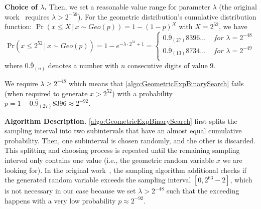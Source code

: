 \textbf{Choice of $\lambda$.}
Then, we set a reasonable value range for parameter $\lambda$ (the original work~\cite{googleDP2019} requires $\lambda > 2^{-59}$).
For the geometric distribution's cumulative distribution function: $\Pr\left(x\leq X \,|\,x \sim Geo\left(p\right) \right) =1-\left(1-p\right)^X $ with $X=2^{52}$, we have
\begin{equation}
    \text{Pr}\left(x \leq 2^{52}\,|\,x \sim Geo\left(p\right)\right)=
    1-e^{-\lambda\cdot 2^{52}+1 }=
    \begin{cases}
        0.\overline{9}_{\left(27\right) }8396\ldots & \textit{ for }\lambda=2^{-48} \\
        0.\overline{9}_{\left(13\right) }8734\ldots & \textit{ for }\lambda=2^{-49} \\
    \end{cases}
\end{equation}
where $0.\overline{9}_{\left(n\right) }$ denotes a number with $n$ consecutive digits of value $9$.

We require $\lambda\geq 2^{-48}$ which means that \autoref{algo:GeometricExpBinarySearch} fails (when required to generate $x>2^{52}$) with a probability $ p=1- 0.\overline{9}_{\left(27\right) } 8396 \approx 2^{-92}$.

\textbf{Algorithm Description.}
\autoref{algo:GeometricExpBinarySearch} first splits the sampling interval into two subintervals that have an almost equal cumulative probability. Then, one subinterval is chosen randomly, and the other is discarded. This splitting and choosing process is repeated until the remaining sampling interval only contains one value (i.e., the geometric random variable $x$ we are looking for). In the original work~\cite{googleDP2019}, the sampling algorithm additional checks if the generated random variable exceeds the sampling interval $\left[0,  2^{63}-2\right] $, which is not necessary in our case because we set $\lambda>2^{-48}$ such that the exceeding happens with a very low probability $p \approx 2^{-92}$.

